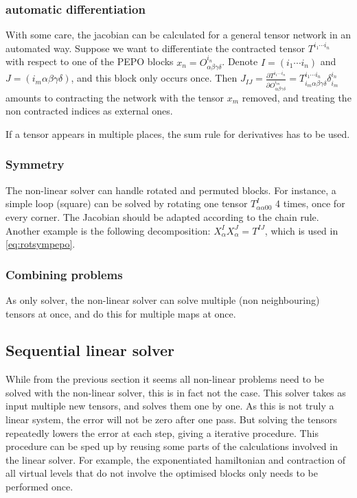 \subsubsection{automatic differentiation}
With some care, the jacobian can be calculated for a general tensor network in an automated way. Suppose we want to differentiate the contracted tensor $T^{i_1  \cdots i_n  }$ with respect to one of the PEPO blocks $x_n = O^{i_n }_{\alpha \beta \gamma \delta}$. Denote $I=(i_1 \cdots i_n )$ and $J=(i_m  \alpha \beta \gamma \delta)$, and this block only occurs once. Then $  J_{I J}  = \frac{\partial T^{i_1  \cdots i_n  } }{  \partial O^{i_m }_{\alpha \beta \gamma \delta} } = T^{i_1 \cdots i_n } _{ i_m  \alpha \beta \gamma \delta}  \delta^{i_n}_{i_m}   $  amounts to  contracting the network with the tensor $x_m$ removed, and treating the non contracted indices as external ones.

If a tensor appears in multiple places, the sum rule for derivatives has to be used.

\subsubsection{Symmetry}

The non-linear solver can handle rotated and permuted blocks. For instance, a simple loop (square) can be solved by rotating one tensor $T^I_{ \alpha \alpha 0 0}$ 4 times, once for every corner. The Jacobian should be adapted according to the chain rule. Another example is the following decomposition:  $  X^I_\alpha X^J_\alpha = T^{I J} $, which is used in \cref{eq:rotsympepo}.

\subsubsection{Combining problems}
As only solver, the non-linear solver can solve multiple (non neighbouring) tensors at once, and do this for multiple maps at once.

\subsection{Sequential linear solver}
While from the previous section it seems all non-linear problems need to be solved with the non-linear solver, this is in fact not the case. This solver takes as input multiple new tensors, and solves them one by one. As this is not truly a linear system, the error will not be zero after one pass. But solving the tensors repeatedly lowers the error at each step, giving a iterative procedure. This procedure can be sped up by reusing some parts of the calculations involved in the linear solver. For example, the exponentiated hamiltonian and contraction of all virtual levels that do not involve the optimised blocks only needs to be performed once.

